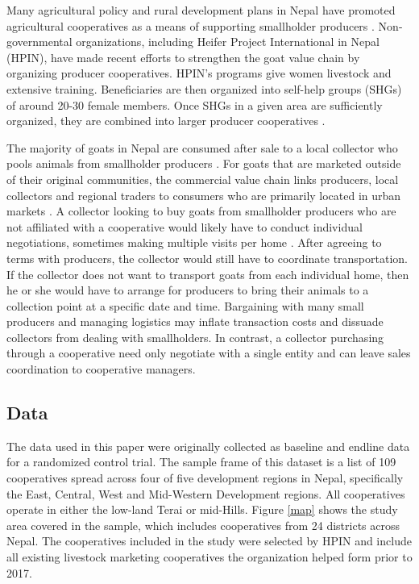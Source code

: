\documentclass[11pt]{article}
\begin{document}
Many agricultural policy and rural development plans in Nepal have promoted agricultural cooperatives as a means of supporting smallholder producers \citep{ADS15}. Non-governmental organizations, including Heifer Project International in Nepal (HPIN), have made recent efforts to strengthen the goat value chain by organizing producer cooperatives. HPIN’s programs give women livestock and extensive training. Beneficiaries are then organized into self-help groups (SHGs) of around 20-30 female members. Once SHGs in a given area are sufficiently organized, they are combined into larger producer cooperatives \citep{janzen-et.al.18}.

The majority of goats in Nepal are consumed after sale to a local collector who pools animals from smallholder producers \citep{HI-N12}. For goats that are marketed outside of their original communities, the commercial value chain links producers, local collectors and regional traders to consumers who are primarily located in urban markets \citep{HI-N12}. A collector looking to buy goats from smallholder producers who are not affiliated with a cooperative would likely have to conduct individual negotiations, sometimes making multiple visits per home \citep{HI-N12, staal-et.al.97}. After agreeing to terms with producers, the collector would still have to coordinate transportation. If the collector does not want to transport goats from each individual home, then he or she would have to arrange for producers to bring their animals to a collection point at a specific date and time. Bargaining with many small producers and managing logistics may inflate transaction costs and dissuade collectors from dealing with smallholders. In contrast, a collector purchasing through a cooperative need only negotiate with a single entity and can leave sales coordination to cooperative managers.

\subsection{Data} \label{sec:data}
The data used in this paper were originally collected as baseline and endline data for a randomized control trial. The sample frame of this dataset is a list of 109 cooperatives spread across four of five development regions in Nepal, specifically the East, Central, West and Mid-Western Development regions. All cooperatives operate in either the low-land Terai or mid-Hills. Figure \ref{map} shows the study area covered in the sample, which includes cooperatives from 24 districts across Nepal. The cooperatives included in the study were selected by HPIN and include all existing livestock marketing cooperatives the organization helped form prior to 2017.
\end{document}
